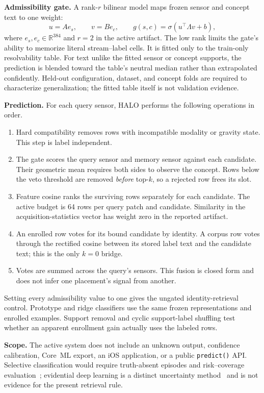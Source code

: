 \textbf{Admissibility gate.} A rank-$r$ bilinear model maps frozen sensor and concept text to one
weight:
\[
 u=Ae_s,\qquad v=Be_c,\qquad
 g(s,c)=\sigma\!\left(u^\top\Lambda v+b\right),
\]
where $e_s,e_c\in\mathbb{R}^{384}$ and $r{=}2$ in the active artifact. The low rank limits the
gate's ability to memorize literal stream--label cells. It is fitted only to the train-only
resolvability table. For text unlike the fitted sensor or concept supports, the prediction is
blended toward the table's neutral median rather than extrapolated confidently. Held-out
configuration, dataset, and concept folds are required to characterize generalization; the fitted
table itself is not validation evidence.

\textbf{Prediction.} For each query sensor, HALO performs the following operations in order.

\begin{enumerate}
  \item Hard compatibility removes rows with incompatible modality or gravity state. This step is
        label independent.
  \item The gate scores the query sensor and memory sensor against each candidate. Their geometric
        mean requires both sides to observe the concept. Rows below the veto threshold are removed
        \emph{before} top-$k$, so a rejected row frees its slot.
  \item Feature cosine ranks the surviving rows separately for each candidate. The active budget is
        64 rows per query patch and candidate. Similarity in the acquisition-statistics vector has
        weight zero in the reported artifact.
  \item An enrolled row votes for its bound candidate by identity. A corpus row votes through the
        rectified cosine between its stored label text and the candidate text; this is the only
        $k{=}0$ bridge.
  \item Votes are summed across the query's sensors. This fusion is closed form and does not infer
        one placement's signal from another.
\end{enumerate}

Setting every admissibility value to one gives the ungated identity-retrieval control. Prototype and
ridge classifiers use the same frozen representations and enrolled examples. Support removal and
cyclic support-label shuffling test whether an apparent enrollment gain actually uses the labeled
rows.

\textbf{Scope.} The active system does not include an unknown output, confidence calibration,
Core~ML export, an iOS application, or a public \texttt{predict()} API. Selective classification
would require truth-absent episodes and risk--coverage evaluation~\cite{selectiveclass}; evidential
deep learning is a distinct uncertainty method~\cite{edl} and is not evidence for the present
retrieval rule.
